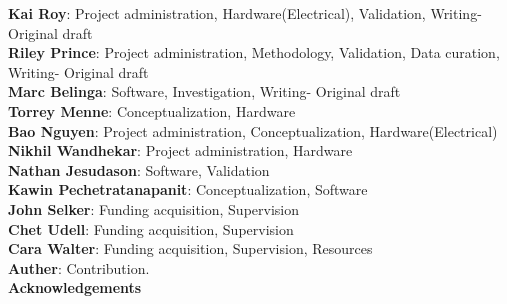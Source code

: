 \documentclass[11pt, letterpaper]{article}
\begin{document}
\noindent
\textbf{Kai Roy}: Project administration, Hardware(Electrical), Validation, Writing- Original draft \\
\noindent
\textbf{Riley Prince}: Project administration, Methodology, Validation, Data curation, Writing- Original draft \\
\noindent
\textbf{Marc Belinga}: Software, Investigation, Writing- Original draft \\
\noindent
\textbf{Torrey Menne}: Conceptualization, Hardware\\
\noindent
\textbf{Bao Nguyen}: Project administration, Conceptualization, Hardware(Electrical)\\
\noindent
\textbf{Nikhil Wandhekar}: Project administration, Hardware\\
\noindent
\textbf{Nathan Jesudason}: Software, Validation \\
\noindent
\textbf{Kawin Pechetratanapanit}: Conceptualization, Software \\
\noindent
\textbf{John Selker}: Funding acquisition, Supervision \\
\noindent
\textbf{Chet Udell}: Funding acquisition, Supervision \\
\noindent
\textbf{Cara Walter}: Funding acquisition, Supervision, Resources \\

\noindent
\textbf{Auther}: Contribution. \\

\noindent
\textbf{Acknowledgements}\\
\end{document}
